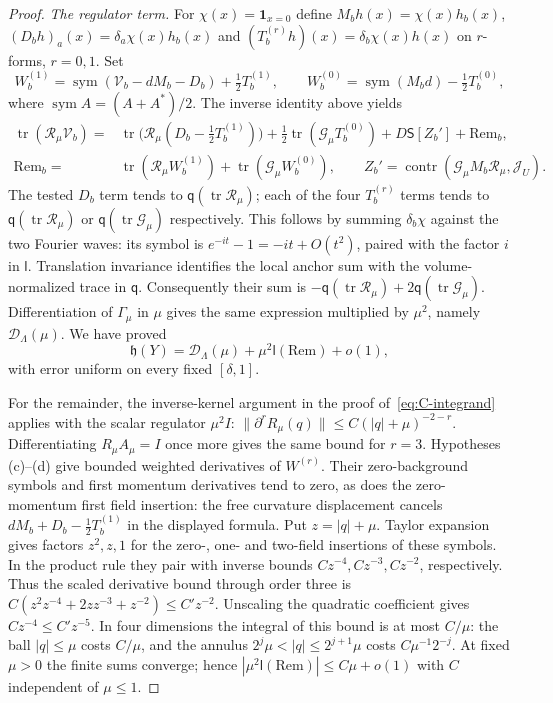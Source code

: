 \begin{proof}
\emph{The regulator term.} For $\chi(x)=\mathbf1_{x=0}$ define $M_bh(x)=\chi(x)h_b(x)$, $(D_bh)_a(x)=\delta_a\chi(x)h_b(x)$ and $(T_b^{(r)}h)(x)=\delta_b\chi(x)h(x)$ on $r$-forms, $r=0,1$. Set
\begin{equation*}
W_b^{(1)}=\operatorname{sym}(\mathcal V_b-dM_b-D_b)+\tfrac12T_b^{(1)},\qquad
W_b^{(0)}=\operatorname{sym}(M_bd)-\tfrac12T_b^{(0)},
\end{equation*}
where $\operatorname{sym}A=(A+A^*)/2$. The inverse identity above yields
\begin{align*}
\operatorname{tr}(\mathcal R_\mu\mathcal V_b)
={}&\operatorname{tr}\bigl(\mathcal R_\mu(D_b-\tfrac12T_b^{(1)})\bigr)
+\tfrac12\operatorname{tr}(\mathcal G_\mu T_b^{(0)})+D\mathsf S[Z_b']+\mathrm{Rem}_b,\\
\mathrm{Rem}_b={}&\operatorname{tr}(\mathcal R_\mu W_b^{(1)})+\operatorname{tr}(\mathcal G_\mu W_b^{(0)}),\qquad
Z_b'=\operatorname{contr}(\mathcal G_\mu M_b\mathcal R_\mu,\mathcal J_U).
\end{align*}
The tested $D_b$ term tends to $\mathsf q(\operatorname{tr}\mathcal R_\mu)$; each of the four $T_b^{(r)}$ terms tends to $\mathsf q(\operatorname{tr}\mathcal R_\mu)$ or $\mathsf q(\operatorname{tr}\mathcal G_\mu)$ respectively. This follows by summing $\delta_b\chi$ against the two Fourier waves: its symbol is $e^{-it}-1=-it+O(t^2)$, paired with the factor $i$ in $\mathsf l$. Translation invariance identifies the local anchor sum with the volume-normalized trace in $\mathsf q$. Consequently their sum is $-\mathsf q(\operatorname{tr}\mathcal R_\mu)+2\mathsf q(\operatorname{tr}\mathcal G_\mu)$. Differentiation of $\Gamma_\mu$ in $\mu$ gives the same expression multiplied by $\mu^2$, namely $\mathcal D_\Lambda(\mu)$. We have proved
\begin{equation}\label{eq:I-regulated-ward}
\mathfrak h(Y)=\mathcal D_\Lambda(\mu)+\mu^2\mathsf l(\mathrm{Rem})+o(1),
\end{equation}
with error uniform on every fixed $[\delta,1]$.

For the remainder, the inverse-kernel argument in the proof of~\eqref{eq:C-integrand} applies with the scalar regulator $\mu^2I$: $\|\partial^rR_\mu(q)\|\le C(|q|+\mu)^{-2-r}$. Differentiating $R_\mu A_\mu=I$ once more gives the same bound for $r=3$. Hypotheses (c)--(d) give bounded weighted derivatives of $W^{(r)}$. Their zero-background symbols and first momentum derivatives tend to zero, as does the zero-momentum first field insertion: the free curvature displacement cancels $dM_b+D_b-\frac12T_b^{(1)}$ in the displayed formula. Put $z=|q|+\mu$. Taylor expansion gives factors $z^2,z,1$ for the zero-, one- and two-field insertions of these symbols. In the product rule they pair with inverse bounds $Cz^{-4},Cz^{-3},Cz^{-2}$, respectively. Thus the scaled derivative bound through order three is $C(z^2z^{-4}+2zz^{-3}+z^{-2})\le C'z^{-2}$. Unscaling the quadratic coefficient gives $Cz^{-4}\le C'z^{-5}$. In four dimensions the integral of this bound is at most $C/\mu$: the ball $|q|\le\mu$ costs $C/\mu$, and the annulus $2^j\mu<|q|\le2^{j+1}\mu$ costs $C\mu^{-1}2^{-j}$. At fixed $\mu>0$ the finite sums converge; hence $|\mu^2\mathsf l(\mathrm{Rem})|\le C\mu+o(1)$ with $C$ independent of $\mu\le1$.


\end{proof}
